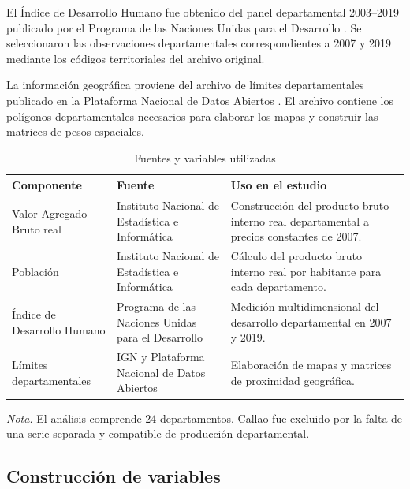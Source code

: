 El Índice de Desarrollo Humano fue obtenido del panel departamental
2003--2019 publicado por el Programa de las Naciones Unidas para el Desarrollo
\parencite{pnud_idh,pnud2019}. Se seleccionaron las observaciones
departamentales correspondientes a 2007 y 2019 mediante los códigos territoriales
del archivo original.

La información geográfica proviene del archivo de límites departamentales
publicado en la Plataforma Nacional de Datos Abiertos
\parencite{limites_departamentales}. El archivo contiene los polígonos
departamentales necesarios para elaborar los mapas y construir las matrices de
pesos espaciales.

\begin{table}[H]
\centering
\caption{Fuentes y variables utilizadas}
\label{tab:fuentes_variables}
\small
\begin{threeparttable}
\begin{tabular}{p{3.1cm}p{4.1cm}p{5.9cm}}
\toprule
\textbf{Componente} &
\textbf{Fuente} &
\textbf{Uso en el estudio} \\
\midrule
Valor Agregado Bruto real &
Instituto Nacional de Estadística e Informática &
Construcción del producto bruto interno real departamental a precios
constantes de 2007. \\

Población &
Instituto Nacional de Estadística e Informática &
Cálculo del producto bruto interno real por habitante para cada departamento. \\

Índice de Desarrollo Humano &
Programa de las Naciones Unidas para el Desarrollo &
Medición multidimensional del desarrollo departamental en 2007 y 2019. \\

Límites departamentales &
IGN y Plataforma Nacional de Datos Abiertos &
Elaboración de mapas y matrices de proximidad geográfica. \\
\bottomrule
\end{tabular}
\begin{tablenotes}
\footnotesize
\item \textit{Nota.} El análisis comprende 24 departamentos. Callao fue
excluido por la falta de una serie separada y compatible de producción
departamental.
\end{tablenotes}
\end{threeparttable}
\end{table}

\subsection{Construcción de variables}

